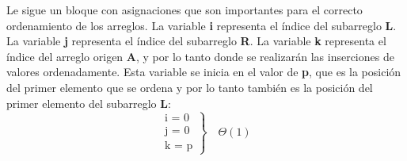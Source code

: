    Le sigue un bloque con asignaciones que son importantes para el correcto ordenamiento de los arreglos.
    La variable \textbf{i} representa el índice del subarreglo \textbf{L}.
    La variable \textbf{j} representa el índice del subarreglo \textbf{R}.
    La variable \textbf{k} representa el índice del arreglo origen \textbf{A}, y por lo tanto donde se realizarán las inserciones de valores ordenadamente. Esta variable se inicia en el valor de \textbf{p}, que es la posición del primer elemento que se ordena y por lo tanto también es la posición del primer elemento del subarreglo \textbf{L}:
    \begin{equation*}
        \left.
            \begin{aligned}
                \text{i = 0} \\
                \text{j = 0} \\
                \text{k = p}
            \end{aligned}
        \right\}
        \quad\Theta(1)
    \end{equation*}
    
